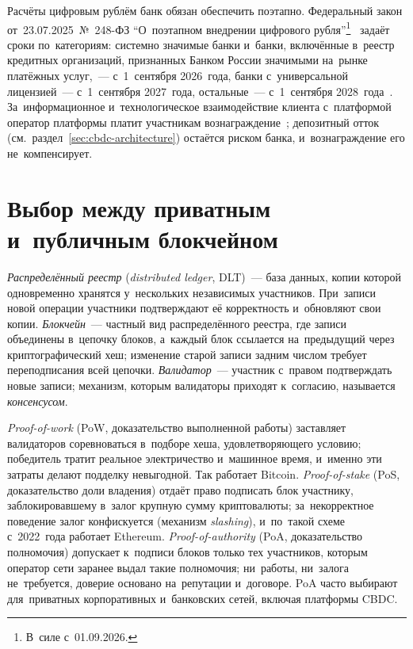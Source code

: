 Расчёты цифровым рублём банк обязан обеспечить поэтапно. Федеральный закон
от~23.07.2025~№~248-ФЗ \enquote{О~поэтапном внедрении цифрового рубля}\footnote{В~силе
с~01.09.2026.}~\cite{fz-248} задаёт сроки по~категориям: системно значимые
банки и~банки, включённые в~реестр кредитных организаций, признанных Банком
России значимыми на~рынке платёжных услуг,~--- с~1~сентября 2026~года, банки
с~универсальной лицензией~--- с~1~сентября 2027~года, остальные~---
с~1~сентября 2028~года~\cite{cbr-mass-rollout-2025,cbr-significant-payment-services-register}.
За~информационное и~технологическое взаимодействие клиента с~платформой оператор
платформы платит участникам вознаграждение~\cite{cbr-dr-tariffs-2026}; депозитный
отток (см.~раздел~\ref{sec:cbdc-architecture}) остаётся риском банка,
и~вознаграждение его не~компенсирует.

\section{Выбор между приватным и~публичным блокчейном}\label{sec:cbdc-blockchain-fork}

\emph{Распределённый реестр} (\textit{distributed ledger}, DLT)~--- база данных,
копии которой одновременно хранятся у~нескольких независимых участников.
При~записи новой операции участники подтверждают её корректность и~обновляют
свои копии. \emph{Блокчейн}~--- частный вид распределённого реестра, где записи
объединены в~цепочку блоков, а~каждый блок
ссылается на~предыдущий через криптографический хеш; изменение старой записи
задним числом требует переподписания всей цепочки. \emph{Валидатор}~---
участник с~правом подтверждать новые записи; механизм, которым валидаторы
приходят к~согласию, называется \emph{консенсусом}.

\emph{Proof-of-work} (PoW, доказательство выполненной работы) заставляет
валидаторов соревноваться в~подборе хеша, удовлетворяющего условию; победитель
тратит реальное электричество и~машинное время, и~именно эти затраты делают
подделку невыгодной. Так работает Bitcoin. \emph{Proof-of-stake} (PoS,
доказательство доли владения) отдаёт право подписать блок участнику,
заблокировавшему в~залог крупную сумму криптовалюты; за~некорректное поведение
залог конфискуется (механизм \textit{slashing}), и~по~такой схеме с~2022~года
работает Ethereum. \emph{Proof-of-authority} (PoA, доказательство полномочия)
допускает к~подписи блоков только тех участников, которым оператор сети заранее
выдал такие полномочия; ни~работы, ни~залога не~требуется, доверие основано
на~репутации и~договоре. PoA часто выбирают для~приватных корпоративных
и~банковских сетей, включая платформы CBDC.

